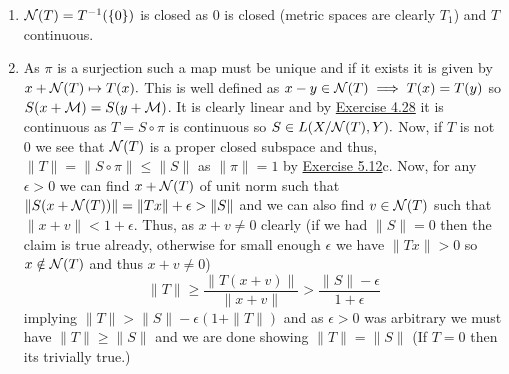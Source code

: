 \documentclass[12pt,a4paper]{article}
\begin{document}
\begin{solution}
\begin{enumerate}[label=\alph*.]
\item $\mathcal{N}(T)= T^{-1}( \qty{0})$ is closed as $ \qty{0}$ is closed (metric spaces are clearly $T_1$) and $T$ continuous. 
\item As $\pi$ is a surjection such a map must be unique and if it exists it is given by $x+\mathcal{N}(T)\mapsto T(x).$ 
    This is well defined as $x-y\in\mathcal{N}(T)\implies T(x)=T(y)$ so $S(x+\mathcal{M})=S(y+\mathcal{M})$. 
    It is clearly linear and by \hyperref[prob:4-28]{Exercise 4.28} it is continuous as $T=S\circ\pi$ is continuous so $S\in L(X/\mathcal{N}(T),Y).$ 
Now, if $T$ is not $0$ we see that $\mathcal{N}(T)$ is a proper closed subspace and thus, $\|T\|=\|S\circ\pi\|\leq\|S\|$ as $\|\pi\|=1$ by \hyperref[prob:5-12]{Exercise 5.12}c. 
    Now, for any $\epsilon>0$ we can find $x+\mathcal{N}(T)$ of unit norm such that $\|S(x+\mathcal{N}(T))\|=\|Tx\|+\epsilon>\|S\|$ and we can also find $v\in\mathcal{N}(T)$ such that $\|x+v\|<1+\epsilon$. 
    Thus, as $x+v\neq 0$ clearly (if we had $\|S\|=0$ then the claim is true already, otherwise for small enough $\epsilon$ we have $\|Tx\|>0$ so $x\notin\mathcal{N}(T)$ and thus $x+v\neq 0$)
    \[
    \|T\|\geq\frac{\|T(x+v)\|}{\|x+v\|}> \frac{\|S\|-\epsilon}{1+\epsilon}
    \]
    implying $\|T\|>\|S\|-\epsilon(1+\|T\|)$ and as $\epsilon>0$ was arbitrary we must have $\|T\|\geq\|S\|$ and we are done showing $\|T\|=\|S\|$ (If $T=0$ then its trivially true.) 
\end{enumerate}
\end{solution}
\end{document}
